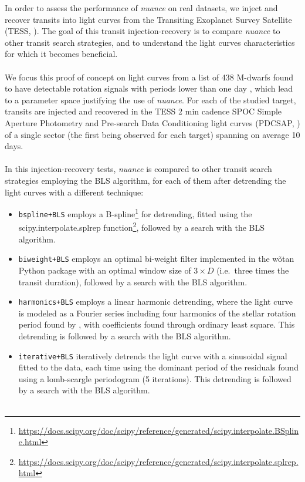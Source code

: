 \documentclass[modern]{aastex631}
\newcommand{\nuancemethod}{\textit{nuance}}
\newcommand{\nuance}{\nuancemethod{}}
\newcommand{\footlink}[1]{\footnote{\url{#1}}}
\begin{document}
In order to assess the performance of \nuance{} on real datasets, we inject and recover transits into light curves from the Transiting Exoplanet Survey Satellite (TESS, \citealt{tess}). The goal of this transit injection-recovery is to compare \nuance{} to other transit search strategies, and to understand the light curves characteristics for which it becomes beneficial.\\\\
We focus this proof of concept on light curves from a list of 438 M-dwarfs found to have detectable rotation signals with periods lower than one day \citep{Ramsay2020}, which lead to a parameter space justifying the use of \nuance{}. For each of the studied target, transits are injected and recovered in the TESS 2 min cadence SPOC Simple Aperture Photometry and Pre-search Data Conditioning light curves (PDCSAP, \citealt{spoc}) of a single sector (the first being observed for each target) spanning on average 10 days.\\\\
In this injection-recovery tests, \nuance{} is compared to other transit search strategies employing the BLS algorithm, for each of them after detrending the light curves with a different technique:
\begin{itemize}
    \item \texttt{bspline+BLS} employs a B-spline\footlink{https://docs.scipy.org/doc/scipy/reference/generated/scipy.interpolate.BSpline.html} for detrending, fitted using the \textsf{scipy.interpolate.splrep} function\footlink{https://docs.scipy.org/doc/scipy/reference/generated/scipy.interpolate.splrep.html}, followed by a search with the BLS algorithm.
    \item \texttt{biweight+BLS} employs an optimal bi-weight filter implemented in the \textsf{wõtan} Python package \citep{wotan} with an optimal window size of $3\times D$ (i.e.\, three times the transit duration), followed by a search with the BLS algorithm.
    \item \texttt{harmonics+BLS} employs a linear harmonic detrending, where the light curve is modeled as a Fourier series including four harmonics of the stellar rotation period found by \cite{Ramsay2020}, with coefficients found through ordinary least square. This detrending is followed by a search with the BLS algorithm.
    \item \texttt{iterative+BLS} iteratively detrends the light curve with a sinusoidal signal fitted to the data, each time using the dominant period of the residuals found using a lomb-scargle periodogram (5 iterations). This detrending is followed by a search with the BLS algorithm.\\\\
\end{itemize}
\end{document}
